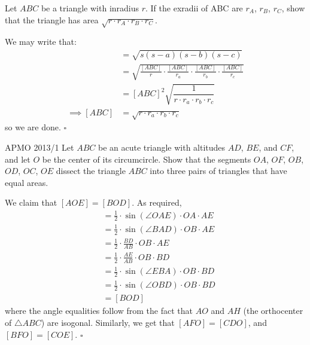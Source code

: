 \documentclass{article}
\begin{document}
\begin{problem}[5.17]{}
Let $ABC$ be a triangle with inradius $r$. If the exradii of ABC are $r_A$, $r_B$, $r_C$, show that the triangle has area $\sqrt{r \cdot r_A \cdot r_B \cdot r_C}$.
\end{problem}

We may write that:
\begin{align*}
[ABC] &= \sqrt{s(s-a)(s-b)(s-c)} \\
&= \sqrt{\tfrac{[ABC]}{r}\cdot \tfrac{[ABC]}{r_a}\cdot \tfrac{[ABC]}{r_b}\cdot \tfrac{[ABC]}{r_c}} \\
&= [ABC]^2\sqrt{\dfrac{1}{r\cdot r_a\cdot r_b\cdot r_c}} \\
\implies [ABC] &= \sqrt{r\cdot r_a\cdot r_b\cdot r_c}
\end{align*}
so we are done. $\square$

\begin{problem}[5.18]{APMO 2013/1}
Let $ABC$ be an acute triangle with altitudes $AD$, $BE$, and $CF$, and let $O$ be the center of its circumcircle.  Show that the segments $OA$, $OF$, $OB$, $OD$, $OC$, $OE$ dissect the triangle $ABC$ into three pairs of triangles that have equal areas.
\end{problem}

We claim that $[AOE] = [BOD]$. As required, 
\begin{align*}
[AOE] &= \tfrac{1}{2}\cdot \sin(\angle OAE)\cdot OA \cdot AE \\
&= \tfrac{1}{2}\cdot \sin(\angle BAD)\cdot OB \cdot AE \\
&= \tfrac{1}{2}\cdot \tfrac{BD}{AB} \cdot OB \cdot AE \\
&= \tfrac{1}{2}\cdot \tfrac{AE}{AB} \cdot OB \cdot BD \\
&= \tfrac{1}{2}\cdot \sin(\angle EBA) \cdot OB \cdot BD \\
&= \tfrac{1}{2}\cdot \sin(\angle OBD) \cdot OB \cdot BD \\
&= [BOD]
\end{align*}
where the angle equalities follow from the fact that $AO$ and $AH$ (the orthocenter of $\triangle ABC$) are isogonal. Similarly, we get that $[AFO] = [CDO]$, and $[BFO] = [COE]$. $\square$

\newpage
\end{document}
